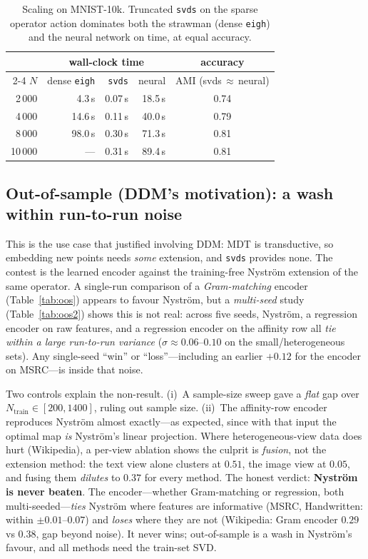 \documentclass[10pt,twocolumn]{article}
\begin{document}
\begin{table}[t]\centering\footnotesize
\caption{Scaling on MNIST-10k. Truncated \texttt{svds} on the sparse operator action dominates both
the strawman (dense \texttt{eigh}) and the neural network on time, at equal accuracy.}
\label{tab:scale}
\begin{tabular}{r rrr c}
\toprule
& \multicolumn{3}{c}{wall-clock time} & accuracy\\
\cmidrule(lr){2-4}
$N$ & dense \texttt{eigh} & \texttt{svds} & neural & AMI (svds\,$\approx$\,neural)\\
\midrule
2\,000  & 4.3\,s  & 0.07\,s & 18.5\,s & 0.74\\
4\,000  & 14.6\,s & 0.11\,s & 40.0\,s & 0.79\\
8\,000  & 98.0\,s & 0.30\,s & 71.3\,s & 0.81\\
10\,000 & ---     & 0.31\,s & 89.4\,s & 0.81\\
\bottomrule
\end{tabular}
\end{table}

\subsection{Out-of-sample (DDM's motivation): a wash within run-to-run noise}
\label{sec:oos}
This is the use case that justified involving DDM: MDT is transductive, so embedding new points needs
\emph{some} extension, and \texttt{svds} provides none. The contest is the learned encoder against the
training-free Nystr\"om extension of the same operator. A single-run comparison of a
\emph{Gram-matching} encoder (Table~\ref{tab:oos}) appears to favour Nystr\"om, but a \emph{multi-seed}
study (Table~\ref{tab:oos2}) shows this is not real: across five seeds, Nystr\"om, a regression encoder
on raw features, and a regression encoder on the affinity row all \emph{tie within a large run-to-run
variance} ($\sigma\!\approx\!0.06$--$0.10$ on the small/heterogeneous sets). Any single-seed ``win'' or
``loss''---including an earlier $+0.12$ for the encoder on MSRC---is inside that noise.

Two controls explain the non-result. (i)~A sample-size sweep gave a \emph{flat} gap over
$N_{\text{train}}\!\in\![200,1400]$, ruling out sample size. (ii)~The affinity-row encoder reproduces
Nystr\"om almost exactly---as expected, since with that input the optimal map \emph{is} Nystr\"om's
linear projection. Where heterogeneous-view data does hurt (Wikipedia), a per-view ablation shows the
culprit is \emph{fusion}, not the extension method: the text view alone clusters at $0.51$, the image
view at $0.05$, and fusing them \emph{dilutes} to $0.37$ for every method. The honest verdict:
\textbf{Nystr\"om is never beaten}. The encoder---whether Gram-matching or regression, both
multi-seeded---\emph{ties} Nystr\"om where features are informative (MSRC, Handwritten: within
$\pm0.01$--$0.07$) and \emph{loses} where they are not (Wikipedia: Gram encoder $0.29$ vs $0.38$, gap
beyond noise). It never wins; out-of-sample is a wash in Nystr\"om's favour, and all methods need the
train-set SVD.
\end{document}
